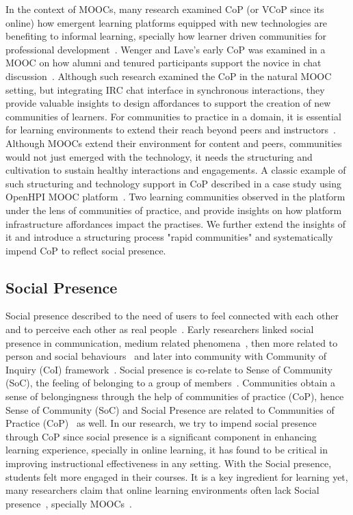 \documentclass[manuscript,screen,review]{acmart}
\begin{document}
In the context of MOOCs, many research examined CoP (or VCoP since its online) how emergent learning platforms equipped with new technologies are benefiting to informal learning, specially how learner driven communities for professional development~\cite{chae2018enhancing}. Wenger and Lave's early CoP was examined in a MOOC on how alumni and tenured participants support the novice in chat discussion~\cite{nelimarkka2015alumni}. Although such research examined the CoP in the natural MOOC setting, but integrating IRC chat interface in synchronous interactions, they provide valuable insights to design affordances to support the creation of new communities of learners. For communities to practice in a domain, it is essential for learning environments to extend their reach beyond peers and instructors~\cite{bruckman2002future}. Although MOOCs extend their environment for content and peers, communities would not just emerged with the technology, it needs the structuring and cultivation to sustain healthy interactions and engagements. A classic example of such structuring and technology support in CoP described in a case study using OpenHPI MOOC platform~\cite{grunewald2013openhpiF}. Two learning communities observed in the platform under the lens of communities of practice, and provide insights on how platform infrastructure affordances impact the practises. We further extend the insights of it and introduce a structuring process "rapid communities" and systematically impend CoP to reflect social presence.  

\subsection{Social Presence}
Social presence described to the need of users to feel connected with each other and to perceive each other as real people~\cite{gunawardena1997social}. Early researchers linked social presence in communication, medium related phenomena~\cite{short1976social}, then more related to person and social behaviours~\cite{festinger1950social} and later into community with Community of Inquiry (CoI) framework~\cite{garrison2009communities}. Social presence is co-relate to Sense of Community (SoC), the feeling of belonging to a group of members~\cite{liu2009community}. Communities obtain a sense of belongingness through the help of communities of practice (CoP), hence Sense of Community (SoC) and Social Presence are related to Communities of Practice (CoP)~\cite{nistor2015sense} as well. In our research, we try to impend social presence through CoP since social presence is a significant component in enhancing learning experience, specially in online learning, it has found to be critical in improving instructional effectiveness in any setting. With the Social presence, students felt more engaged in their courses. It is a key ingredient for learning yet, many researchers claim that online learning environments often lack Social presence~\cite{kehrwald2008understanding,kim2011investigating}, specially MOOCs~\cite{poquet2018social,kovanovic2018exploring}. 
\end{document}

